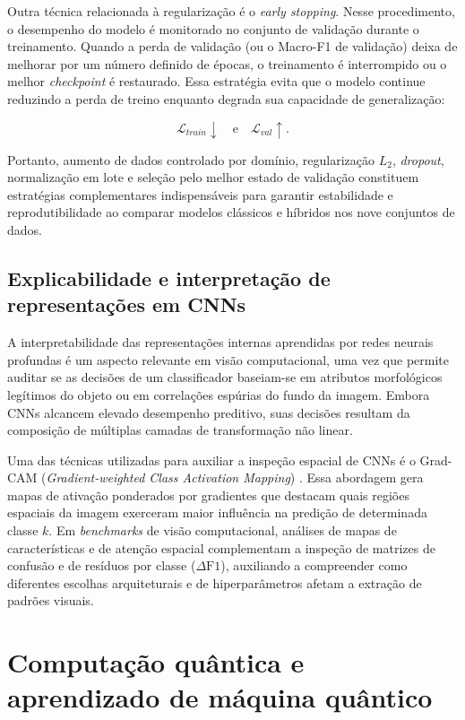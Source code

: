 \documentclass[
    12pt,
    openright,
    oneside,
    a4paper,
    english,
    brazil
]{abntex2}
\begin{document}
Outra técnica relacionada à regularização é o \textit{early stopping}. Nesse procedimento, o desempenho do modelo é monitorado no conjunto de validação durante o treinamento. Quando a perda de validação (ou o Macro-F1 de validação) deixa de melhorar por um número definido de épocas, o treinamento é interrompido ou o melhor \textit{checkpoint} é restaurado. Essa estratégia evita que o modelo continue reduzindo a perda de treino enquanto degrada sua capacidade de generalização:

\[
\mathcal{L}_{train} \downarrow
\quad \text{e} \quad
\mathcal{L}_{val} \uparrow.
\]

Portanto, aumento de dados controlado por domínio, regularização \(L_2\), \textit{dropout}, normalização em lote e seleção pelo melhor estado de validação constituem estratégias complementares indispensáveis para garantir estabilidade e reprodutibilidade ao comparar modelos clássicos e híbridos nos nove conjuntos de dados.

\subsection{Explicabilidade e interpretação de representações em CNNs}

A interpretabilidade das representações internas aprendidas por redes neurais profundas é um aspecto relevante em visão computacional, uma vez que permite auditar se as decisões de um classificador baseiam-se em atributos morfológicos legítimos do objeto ou em correlações espúrias do fundo da imagem. Embora CNNs alcancem elevado desempenho preditivo, suas decisões resultam da composição de múltiplas camadas de transformação não linear.

Uma das técnicas utilizadas para auxiliar a inspeção espacial de CNNs é o Grad-CAM (\textit{Gradient-weighted Class Activation Mapping}) \cite{selvaraju2020gradcam}. Essa abordagem gera mapas de ativação ponderados por gradientes que destacam quais regiões espaciais da imagem exerceram maior influência na predição de determinada classe \(k\). Em \textit{benchmarks} de visão computacional, análises de mapas de características e de atenção espacial complementam a inspeção de matrizes de confusão e de resíduos por classe (\(\Delta\text{F1}\)), auxiliando a compreender como diferentes escolhas arquiteturais e de hiperparâmetros afetam a extração de padrões visuais.

\section{Computação quântica e aprendizado de máquina quântico}
\end{document}
